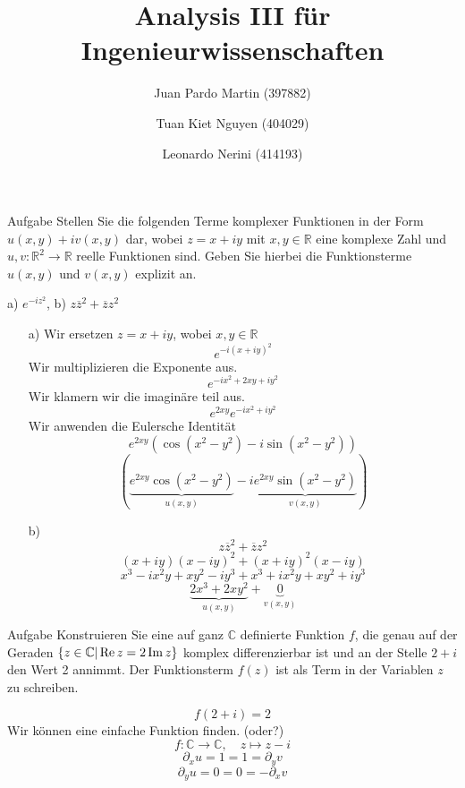 \documentclass{scrartcl}
\title{Analysis III für Ingenieurwissenschaften}
\author{Juan Pardo Martin (397882)\and Tuan Kiet Nguyen (404029)\and Leonardo Nerini (414193)}
\def\mbb#1{\mathbb{#1}}
\def\bC{\mbb{C}}
\newcommand{\func}[3]{#1\colon#2\to#3}
\newcommand{\vfunc}[5]{\func{#1}{#2}{#3},\quad#4\longmapsto#5}
\begin{document}
\maketitle

\begin{section}{Aufgabe}%
Stellen Sie die folgenden Terme komplexer Funktionen in der Form \(u(x, y)+iv(x, y)\) dar,
wobei \(z = x + iy\) mit \(x, y \in \mathbb R\) eine komplexe Zahl und \(u, v : \mathbb R^2 \rightarrow \mathbb R\) reelle Funktionen
sind. Geben Sie hierbei die Funktionsterme \(u(x, y)\) und \(v(x, y)\) explizit an.
\begin{center}
a) \(e^{-i z^2}\),    b) \(z\overline{z}^2+\overline{z}z^2\)
\end{center}
\begin{itemize}
\item[a)]
Wir ersetzen \(z=x+iy\), wobei \(x,y\in \mathbb R\)
\[e^{-i (x+i y)^2}\]
Wir multiplizieren die Exponente aus.
\[e^{-i x^2+2 x y+i y^2}\]
Wir klamern wir die imaginäre teil aus.
\[e^{2 x y} e^{-i x^2+i y^2}\]
Wir anwenden die Eulersche Identität
\[e^{2 x y} \left(\cos \left(x^2-y^2\right)-i \sin \left(x^2-y^2\right)\right)\]
\[\left(\underbrace{e^{2 x y} \cos \left(x^2-y^2\right)}_{u(x,y)}-i \underbrace{e^{2 x y}\sin \left(x^2-y^2\right)}_{v(x,y)}\right)\]
\item[b)]
\[z\overline{z}^2+\overline{z}z^2\]
\[(x+i y) (x-i y)^2+(x+i y)^2 (x-i y)\]
\[x^3-i x^2 y+x y^2-i y^3+x^3+i x^2 y+x y^2+i y^3\]
\[\underbrace{2 x^3 + 2 x y^2}_{u(x,y)}+\underbrace{0}_{v(x,y)}\]
\end{itemize}
\end{section}
\begin{section}{Aufgabe}%
Konstruieren Sie eine auf ganz $\bC$ definierte Funktion $f$, die genau auf der Geraden \(\qty{z \in
\mathbb C | \Re z = 2 \Im z}\) komplex differenzierbar ist 
und an der Stelle \(2 + i\) den Wert 2 annimmt. Der Funktionsterm 
$f(z)$ ist als Term in der Variablen $z$ zu schreiben.

\[f(2+i)=2\]
Wir können eine einfache Funktion finden. (oder?)
\[\vfunc{f}{\bC}{\bC}{z}{z-i}\]
\[\partial_x u = 1 = 1 = \partial_y v\]
\[\partial_y u = 0 = 0 = - \partial_x v\]
\end{section}
\end{document}
